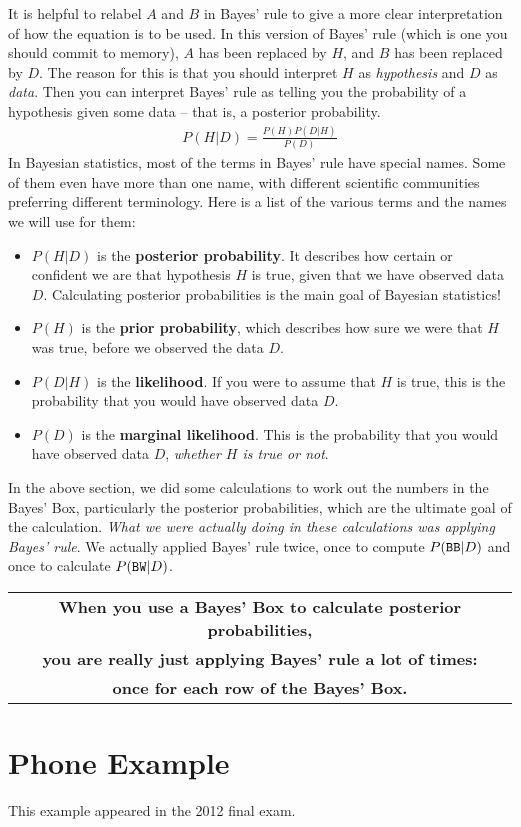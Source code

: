 It is helpful to relabel $A$ and $B$ in Bayes' rule to give a more clear
interpretation of how the equation is to be used. In this version of Bayes'
rule (which is one you should commit to memory), $A$ has been replaced by $H$,
and $B$ has been replaced by $D$. The reason for this is that you should
interpret $H$ as {\it hypothesis} and $D$ as {\it data}. Then you can interpret
Bayes' rule as telling you the probability of a hypothesis given some data --
that is, a posterior probability.
\begin{eqnarray}
P(H|D) = \frac{P(H)P(D|H)}{P(D)}
\end{eqnarray}
In Bayesian statistics, most of the terms in Bayes' rule have special names.
Some of them even have more than one name, with different scientific
communities preferring different terminology. Here is a list of the
various terms and the names we will use for them:
\begin{itemize}
\item $P(H|D)$ is the {\bf posterior probability}. It describes how certain
or confident we are that
hypothesis $H$ is true, given that we have observed data $D$. Calculating
posterior probabilities is the main goal of Bayesian statistics!
\item $P(H)$ is the {\bf prior probability}, which describes how sure we were
that $H$ was true, before we observed the data $D$.
\item $P(D|H)$ is the {\bf likelihood}. If you were to assume that $H$ is true,
this is the probability that you would have observed data $D$.
\item $P(D)$ is the {\bf marginal likelihood}. This is the probability that you
would have observed data $D$, {\it whether $H$ is true or not}.
\end{itemize}

In the above section, we did some calculations to work out the numbers in the
Bayes' Box, particularly the posterior probabilities, which are the ultimate
goal of the calculation. {\it What we were actually doing in these calculations
was applying Bayes' rule}. We actually applied Bayes' rule twice, once to
compute $P(\texttt{BB} | D)$ and once to calculate $P(\texttt{BW} | D)$.


\begin{center}
\begin{tabular}{|c|}
\hline
{\bf When you use a Bayes' Box to calculate posterior probabilities,}\\
{\bf you are really just applying Bayes' rule a lot of times:}\\
{\bf once for each row of the Bayes' Box.}\\
\hline
\end{tabular}
\end{center}









\section{Phone Example}
This example appeared in the 2012 final exam.


